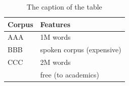 \documentclass[11pt]{article}
\begin{document}
\begin{table}[h]
 \begin{center}
\begin{tabular}{|l|l|}

      \hline
      Corpus & Features\\
      \hline\hline
      AAA & 1M words\\
      BBB & spoken corpus (expensive)\\
      CCC & 2M words\\
        & free (to academics)\\
      \hline

\end{tabular}
\caption{The caption of the table}\label{table1}
 \end{center}
\end{table}



\end{document}
